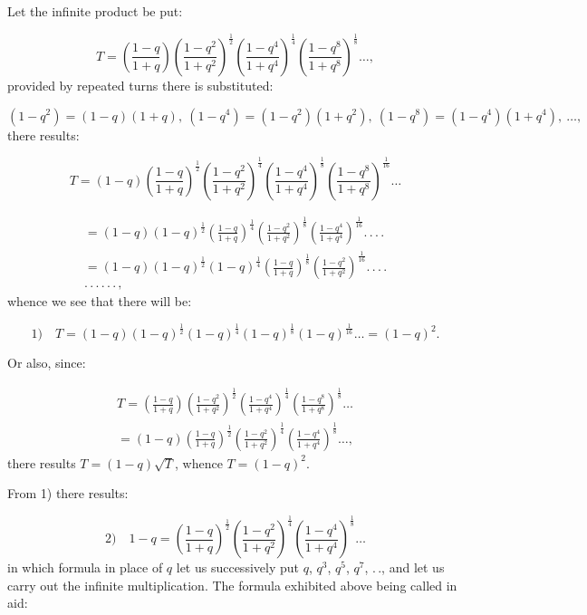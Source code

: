 \documentclass{article}
\begin{document}
Let the infinite product be put:

\[
T=\left(\frac{1-q}{1+q}\right)\left(\frac{1-q^{2}}{1+q^{2}}\right)^{\frac{1}{2}}\left(\frac{1-q^{4}}{1+q^{4}}\right)^{\frac{1}{4}}\left(\frac{1-q^{8}}{1+q^{8}}\right)^{\frac{1}{8}}\ldots,
\]
provided by repeated turns there is substituted:

\[
(1-q^{2})=(1-q)(1+q),\ (1-q^{4})=(1-q^{2})(1+q^{2}),\ (1-q^{8})=(1-q^{4})(1+q^{4}),\ \ldots,
\]
there results:

\[
T=(1-q)\left(\frac{1-q}{1+q}\right)^{\frac{1}{2}}\left(\frac{1-q^{2}}{1+q^{2}}\right)^{\frac{1}{4}}\left(\frac{1-q^{4}}{1+q^{4}}\right)^{\frac{1}{8}}\left(\frac{1-q^{8}}{1+q^{8}}\right)^{\frac{1}{16}}\ldots
\]

\[
\begin{gathered}
=(1-q)(1-q)^{\frac{1}{2}}\left(\frac{1-q}{1+q}\right)^{\frac{1}{4}}\left(\frac{1-q^{2}}{1+q^{2}}\right)^{\frac{1}{8}}\left(\frac{1-q^{4}}{1+q^{4}}\right)^{\frac{1}{16}}.\,.\,.\,.\\[1.5ex]
=(1-q)(1-q)^{\frac{1}{2}}(1-q)^{\frac{1}{4}}\left(\frac{1-q}{1+q}\right)^{\frac{1}{8}}\left(\frac{1-q^{2}}{1+q^{2}}\right)^{\frac{1}{16}}.\,.\,.\,.\\[1.5ex]
.\,.\,.\,.\,.\,.\,,
\end{gathered}
\]
whence we see that there will be:

\[
\text{1)}\quad T=(1-q)(1-q)^{\frac{1}{2}}(1-q)^{\frac{1}{4}}(1-q)^{\frac{1}{8}}(1-q)^{\frac{1}{16}}\ldots=(1-q)^{2}.
\]

Or also, since:

\[
\begin{gathered}
T=\left(\frac{1-q}{1+q}\right)\left(\frac{1-q^{2}}{1+q^{2}}\right)^{\frac{1}{2}}\left(\frac{1-q^{4}}{1+q^{4}}\right)^{\frac{1}{4}}\left(\frac{1-q^{8}}{1+q^{8}}\right)^{\frac{1}{8}}\ldots\\[1.5ex]
=(1-q)\left(\frac{1-q}{1+q}\right)^{\frac{1}{2}}\left(\frac{1-q^{2}}{1+q^{2}}\right)^{\frac{1}{4}}\left(\frac{1-q^{4}}{1+q^{4}}\right)^{\frac{1}{8}}\ldots,
\end{gathered}
\]
there results $T=(1-q)\sqrt{T}$, whence $T=(1-q)^{2}$.

From 1) there results:

\[
\text{2)}\quad 1-q=\left(\frac{1-q}{1+q}\right)^{\frac{1}{2}}\left(\frac{1-q^{2}}{1+q^{2}}\right)^{\frac{1}{4}}\left(\frac{1-q^{4}}{1+q^{4}}\right)^{\frac{1}{8}}\ldots
\]
in which formula in place of $q$ let us successively put $q$, $q^{3}$, $q^{5}$, $q^{7}$, $.\,.$, and let us carry out the infinite multiplication. The formula exhibited above being called in aid:
\end{document}
